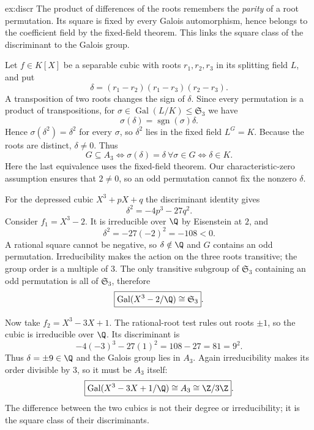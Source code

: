 \begin{solution}{ex:discr}
\idea The product of differences of the roots remembers the \emph{parity} of a root permutation. Its square is fixed by every Galois automorphism, hence belongs to the coefficient field by the fixed-field theorem. This links the square class of the discriminant to the Galois group.

\writeup Let $f\in K[X]$ be a separable cubic with roots $r_1,r_2,r_3$ in its splitting field $L$, and put
\[
\delta=(r_1-r_2)(r_1-r_3)(r_2-r_3).
\]
A transposition of two roots changes the sign of $\delta$. Since every permutation is a product of transpositions, for $\sigma\in\operatorname{Gal}(L/K)\le\mathfrak S_3$ we have
\[
\sigma(\delta)=\operatorname{sgn}(\sigma)\delta.
\]
Hence $\sigma(\delta^2)=\delta^2$ for every $\sigma$, so $\delta^2$ lies in the fixed field $L^G=K$. Because the roots are distinct, $\delta\ne0$. Thus
\[
\boxed{G\subseteq A_3\iff\sigma(\delta)=\delta\ \forall\sigma\in G
\iff\delta\in K}.
\]
Here the last equivalence uses the fixed-field theorem. Our characteristic-zero assumption ensures that $2\ne0$, so an odd permutation cannot fix the nonzero $\delta$.

For the depressed cubic $X^3+pX+q$ the discriminant identity gives
\[
\delta^2=-4p^3-27q^2.
\]
Consider $f_1=X^3-2$. It is irreducible over $\Q$ by Eisenstein at $2$, and
\[
\delta^2=-27(-2)^2=-108<0.
\]
A rational square cannot be negative, so $\delta\notin\Q$ and $G$ contains an odd permutation. Irreducibility makes the action on the three roots transitive; the group order is a multiple of $3$. The only transitive subgroup of $\mathfrak S_3$ containing an odd permutation is all of $\mathfrak S_3$, therefore
\[
\boxed{\operatorname{Gal}(X^3-2/\Q)\cong\mathfrak S_3}.
\]

Now take $f_2=X^3-3X+1$. The rational-root test rules out roots $\pm1$, so the cubic is irreducible over $\Q$. Its discriminant is
\[
-4(-3)^3-27(1)^2=108-27=81=9^2.
\]
Thus $\delta=\pm9\in\Q$ and the Galois group lies in $A_3$. Again irreducibility makes its order divisible by $3$, so it must be $A_3$ itself:
\[
\boxed{\operatorname{Gal}(X^3-3X+1/\Q)\cong A_3\cong\Z/3\Z}.
\]
The difference between the two cubics is not their degree or irreducibility; it is the square class of their discriminants.
\end{solution}

